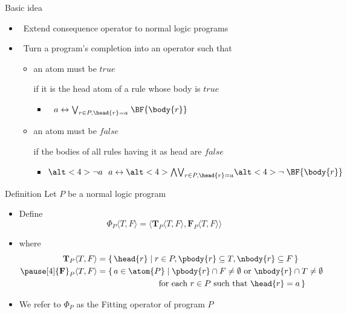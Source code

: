 \begin{frame}{Basic idea}
  \bigskip
  \begin{itemize}
  \item {} \ Extend consequence operator to normal logic programs
    \medskip
  \item {} \
    Turn a program's completion into an operator such that
    \smallskip
    \begin{itemize}\normalsize
    \item an atom must be $\mathit{true}$
      \par\smallskip
      if it is the head atom of a rule whose body is $\mathit{true}$
      \smallskip
      \begin{itemize}\normalsize
      \item<only@2->
        \(
        \phantom{\neg}a
        \leftrightarrow
        \textstyle{\bigvee_{r\in P, \head{r} = a}}\; \BF{\body{r}}
        \)
      \end{itemize}
    \smallskip
    \item an atom must be $\mathit{false}$
      \par\smallskip
      if the bodies of all rules having it as head are $\mathit{false}$
      \smallskip
      \begin{itemize}\normalsize
      \item<only@3->
        \(
        \alt<4>{\neg a}{\phantom{\neg}a}
        \leftrightarrow
        \textstyle{\alt<4>{\bigwedge}{\bigvee}_{r\in P, \head{r} = a}}\alt<4>{\neg}{\;} \BF{\body{r}}
        \)
      \end{itemize}
    \end{itemize}
  \end{itemize}
  \nocite{fitting02a}
\end{frame}
\begin{frame}{Definition}
  \medskip
  Let $P$ be a normal logic program
  \medskip
  \begin{itemize}
  \item<2-> Define
    \[
      \Phi_P\langle T,F \rangle
      =
      \langle
      {\mathbf{T}}_P\langle T,F \rangle,
      {\mathbf{F}}_P\langle T,F \rangle
      \rangle
    \]
  \item<3-> []
    where
    \begin{align*}
      {\mathbf{T}}_P\langle T,F \rangle
      & =
      \{\, \head{r} \mid r \in P, \pbody{r} \subseteq T, \nbody{r} \subseteq F \,\}
      \\\pause[4]
      {\mathbf{F}}_P\langle T,F \rangle
      & =
      \{\, a \in \atom{P} \mid
      \pbody{r} \cap F \neq \emptyset
      \text{ or }
      \nbody{r} \cap T \neq \emptyset
      \\
      & \kern 71pt
      \text{ for each } r \in P
      \text{ such that }
      \head{r} = a
      \,\}
    \end{align*}
  \item<5-> We refer to $\Phi_P$ as the \alert{Fitting operator} of program $P$
  \end{itemize}
\end{frame}
